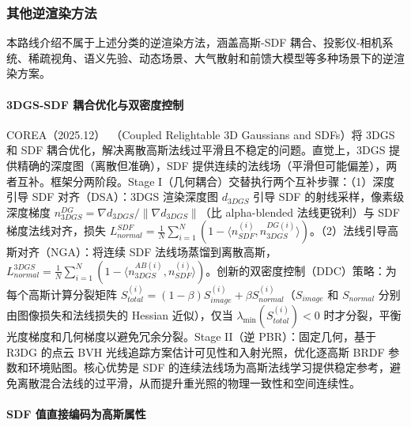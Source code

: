 \subsubsection{其他逆渲染方法}

本路线介绍不属于上述分类的逆渲染方法，涵盖高斯-SDF 耦合、投影仪-相机系统、稀疏视角、语义先验、动态场景、大气散射和前馈大模型等多种场景下的逆渲染方案。

\paragraph{3DGS-SDF 耦合优化与双密度控制}

COREA（2025.12）~\cite{2512_07107}（Coupled Relightable 3D Gaussians and SDFs）将 3DGS 和 SDF 耦合优化，解决离散高斯法线过平滑且不稳定的问题。直觉上，3DGS 提供精确的深度图（离散但准确），SDF 提供连续的法线场（平滑但可能偏差），两者互补。框架分两阶段。Stage I（几何耦合）交替执行两个互补步骤：（1）深度引导 SDF 对齐（DSA）：3DGS 渲染深度图 $d_{3DGS}$ 引导 SDF 的射线采样，像素级深度梯度 $n_{3DGS}^{DG} = \nabla d_{3DGS}/\|\nabla d_{3DGS}\|$（比 alpha-blended 法线更锐利）与 SDF 梯度法线对齐，损失 $L_{normal}^{SDF} = \frac{1}{N}\sum_{i=1}^{N}(1 - \langle n_{SDF}^{(i)}, n_{3DGS}^{DG(i)} \rangle)$。（2）法线引导高斯对齐（NGA）：将连续 SDF 法线场蒸馏到离散高斯，$L_{normal}^{3DGS} = \frac{1}{N}\sum_{i=1}^{N}(1 - \langle n_{3DGS}^{AB(i)}, n_{SDF}^{(i)} \rangle)$。创新的双密度控制（DDC）策略：为每个高斯计算分裂矩阵 $S_{total}^{(i)} = (1-\beta)S_{image}^{(i)} + \beta S_{normal}^{(i)}$（$S_{image}$ 和 $S_{normal}$ 分别由图像损失和法线损失的 Hessian 近似），仅当 $\lambda_{\min}(S_{total}^{(i)}) < 0$ 时才分裂，平衡光度梯度和几何梯度以避免冗余分裂。Stage II（逆 PBR）：固定几何，基于 R3DG 的点云 BVH 光线追踪方案估计可见性和入射光照，优化逐高斯 BRDF 参数和环境贴图。核心优势是 SDF 的连续法线场为高斯法线学习提供稳定参考，避免离散混合法线的过平滑，从而提升重光照的物理一致性和空间连续性。

\paragraph{SDF 值直接编码为高斯属性}

